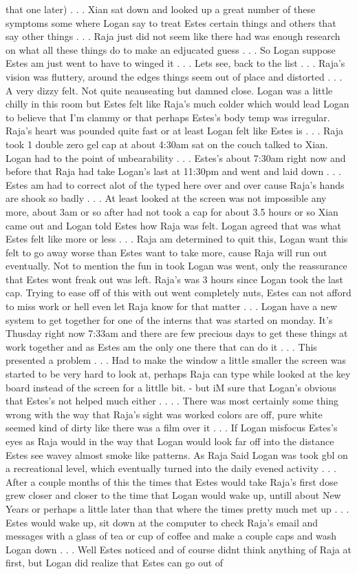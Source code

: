 \documentclass[12pt]{book}
\begin{document}
that one later) . . .  Xian sat down and looked up a great number of these symptoms some where Logan say to treat Estes certain things and others that say other things . . .  Raja just did not seem like there had was enough research on what all these things do to make an edjucated guess . . .  So Logan suppose Estes am just went to have to winged it . . .  Lets see, back to the list . . .  Raja's vision was fluttery, around the edges things seem out of place and distorted . . .  A very dizzy felt. Not quite neauseating but damned close. Logan was a little chilly in this room but Estes felt like Raja's much colder which would lead Logan to believe that I'm clammy or that perhaps Estes's body temp was irregular. Raja's heart was pounded quite fast or at least Logan felt like Estes is . . .  Raja took 1 double zero gel cap at about 4:30am sat on the couch talked to Xian. Logan had to the point of unbearability . . .  Estes's about 7:30am right now and before that Raja had take Logan's last at 11:30pm and went and laid down . . .  Estes am had to correct alot of the typed here over and over cause Raja's hands are shook so badly . . .  At least looked at the screen was not impossible any more, about 3am or so after had not took a cap for about 3.5 hours or so Xian came out and Logan told Estes how Raja was felt. Logan agreed that was what Estes felt like more or less . . .  Raja am determined to quit this, Logan want this felt to go away worse than Estes want to take more, cause Raja will run out eventually. Not to mention the fun in took Logan was went, only the reassurance that Estes wont freak out was left. Raja's was 3 hours since Logan took the last cap. Trying to ease off of this with out went completely nuts, Estes can not afford to miss work or hell even let Raja know for that matter . . .  Logan have a new system to get together for one of the interns that was started on monday. It's Thusday right now 7:33am and there are few precious days to get these things at work together and as Estes am the only one there that can do it . . .  This presented a problem . . .  Had to make the window a little smaller the screen was started to be very hard to look at, perhaps Raja can type while looked at the key board instead of the screen for a littlle bit. - but iM sure that Logan's obvious that Estes's not helped much either . . .  . There was most certainly some thing wrong with the way that Raja's sight was worked colors are off, pure white seemed kind of dirty like there was a film over it . . .  If Logan misfocus Estes's eyes as Raja would in the way that Logan would look far off into the distance Estes see wavey almost smoke like patterns. As Raja Said Logan was took gbl on a recreational level, which eventually turned into the daily evened activity . . .  After a couple months of this the times that Estes would take Raja's first dose grew closer and closer to the time that Logan would wake up, untill about New Years or perhaps a little later than that where the times pretty much met up . . .  Estes would wake up, sit down at the computer to check Raja's email and messages with a glass of tea or cup of coffee and make a couple caps and wash Logan down . . .  Well Estes noticed and of course didnt think anything of Raja at first, but Logan did realize that Estes can go out of 
\end{document}
